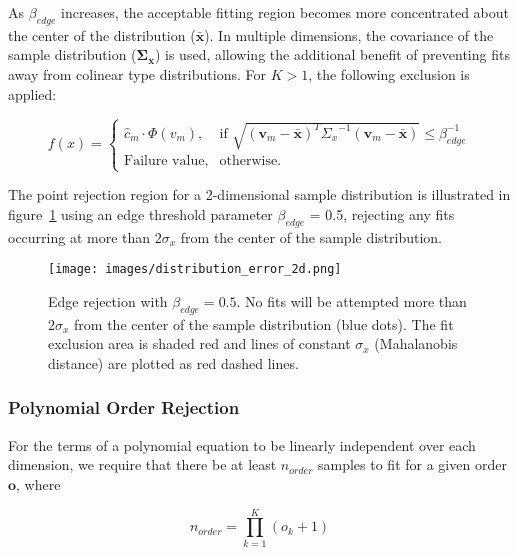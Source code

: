 As $\beta_{edge}$ increases, the acceptable fitting region becomes more
concentrated about the center of the distribution ($\bar{\bm{x}}$).
In multiple dimensions, the covariance of the sample distribution
($\bm{\Sigma_x}$) is used, allowing the additional benefit of preventing fits
away from colinear type distributions.
For $K > 1$, the following exclusion is applied:

\begin{equation}
    f(x)=\begin{cases}
        \hat{c}_m \cdot \Phi(v_m), & \textrm{if }
             \sqrt{(\bm{v}_{m} - \bar{\bm{x}})^{T}
             {\Sigma_x}^{-1}(\bm{v}_m - \bar{\bm{x}})}
             \leq \beta_{edge}^{-1}\\
         \textrm{Failure value}, & \textrm{otherwise.}
    \end{cases}
    \label{eq:equation16}
\end{equation}

The point rejection region for a 2-dimensional sample distribution is
illustrated in figure~\ref{fig:distribution_error_2d} using an edge threshold
parameter $\beta_{edge}$ = 0.5, rejecting any fits occurring at more than
$2\sigma_x$ from the center of the sample distribution.

\begin{figure}[H]
  \begin{center}
  \texttt{[image: images/distribution\_error\_2d.png]}
  \caption{Edge rejection with $\beta_{edge}=0.5$.  No fits will be attempted
           more than $2\sigma_x$ from the center of the sample distribution
           (blue dots).  The fit exclusion area is shaded red and lines of
           constant $\sigma_x$ (Mahalanobis distance) are plotted as red dashed
           lines.}
  \label{fig:distribution_error_2d}
  \end{center}
\end{figure}

\subsubsection{Polynomial Order Rejection}
\label{subsubsec:order-rejection}

For the terms of a polynomial equation to be linearly independent over each
dimension, we require that there be at least $n_{order}$ samples to fit for
a given order $\bm{o}$, where

\begin{equation}
    n_{order} = \prod_{k=1}^{K}{(o_k + 1)}
    \label{eq:equation17}
\end{equation}

